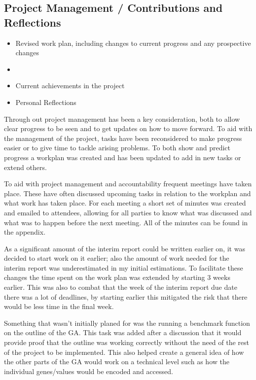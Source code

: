 \documentclass[a4paper]{article}
\begin{document}
\subsection{Project Management / Contributions and Reflections}
\begin{itemize}
    \item Revised work plan, including changes to current progress and any prospective changes
    \item
    \item Current achievements in the project
    \item Personal Reflections
\end{itemize}
\par
Through out project management has been a key consideration, both to allow clear progress to be seen and to get updates on how to move forward.
To aid with the management of the project, tasks have been reconsidered to make progress easier or to give time to tackle arising problems.
To both show and predict progress a workplan was created and has been updated to add in new tasks or extend others.
\\ \par
To aid with project management and accountability frequent meetings have taken place.
These have often discussed upcoming tasks in relation to the workplan and what work has taken place.
For each meeting a short set of minutes was created and emailed to attendees, allowing for all parties to know what was discussed and what was to happen before the next meeting.
All of the minutes can be found in the appendix.
\\ \par
As a significant amount of the interim report could be written earlier on, it was decided to start work on it earlier; also the amount of work needed for the interim report was underestimated in my initial estimations.
To facilitate these changes the time spent on the work plan was extended by starting 3 weeks earlier.
This was also to combat that the week of the interim report due date there was a lot of deadlines, by starting earlier this mitigated the risk that there would be less time in the final week.
\par
Something that wasn't initially planed for was the running a benchmark function on the outline of the GA.
This task was added after a discussion that it would provide proof that the outline was working correctly without the need of the rest of the project to be implemented.
This also helped create a general idea of how the other parts of the GA would work on a technical level such as how the individual genes/values would be encoded and accessed.
\end{document}

